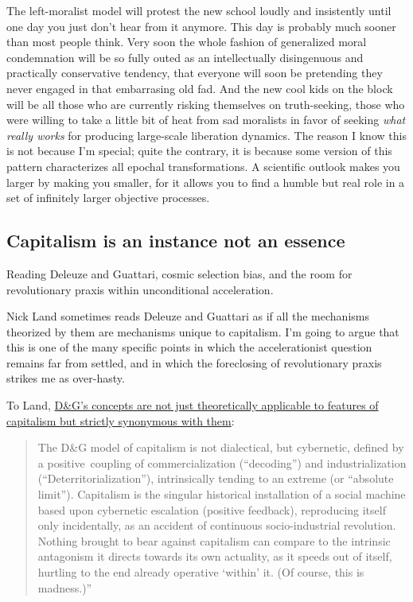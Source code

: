 \documentclass[a4paper,12pt,margin=.5in]{article}
\begin{document}
The left-moralist model will protest the new school loudly and
insistently until one day you just don't hear from it anymore. This day
is probably much sooner than most people think. Very soon the whole
fashion of generalized moral condemnation will be so fully outed as an
intellectually disingenuous and practically conservative tendency, that
everyone will soon be pretending they never engaged in that embarrasing
old fad. And the new cool kids on the block will be all those who are
currently risking themselves on truth-seeking, those who were willing to
take a little bit of heat from sad moralists in favor of seeking
\emph{what really works} for producing large-scale liberation dynamics.
The reason I know this is not because I'm special; quite the contrary,
it is because some version of this pattern characterizes all epochal
transformations. A scientific outlook makes you larger by making you
smaller, for it allows you to find a humble but real role in a set of
infinitely larger objective processes.

\subsection{Capitalism is an instance not an
essence}\label{capitalism-is-an-instance-not-an-essence}

Reading Deleuze and Guattari, cosmic selection bias, and the room for
revolutionary praxis within unconditional acceleration.

Nick Land sometimes reads Deleuze and Guattari as if all the mechanisms
theorized by them are mechanisms unique to capitalism. I'm going to
argue that this is one of the many specific points in which the
accelerationist question remains far from settled, and in which the
foreclosing of revolutionary praxis strikes me as over-hasty.

To Land, \href{http://www.xenosystems.net/re-accelerationism/}{D\&G's
concepts are not just theoretically applicable to features of capitalism
but strictly synonymous with them}:

\begin{quote}
The D\&G model of capitalism is not dialectical, but cybernetic, defined
by a positive~coupling of commercialization (``decoding'') and
industrialization (``Deterritorialization''), intrinsically tending to
an extreme (or ``absolute limit''). Capitalism is the singular
historical installation of a social machine based upon cybernetic
escalation (positive feedback), reproducing itself only incidentally, as
an accident of continuous socio-industrial revolution. Nothing brought
to bear against capitalism can compare to the intrinsic antagonism it
directs towards its own actuality, as it speeds out of itself, hurtling
to the end already operative `within' it. (Of course, this is
madness.)''
\end{quote}
\end{document}
